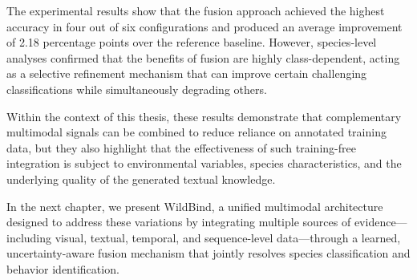 The experimental results show that the fusion approach achieved the highest accuracy in four out of six configurations and produced an average improvement of 2.18 percentage points over the reference baseline. However, species-level analyses confirmed that the benefits of fusion are highly class-dependent, acting as a selective refinement mechanism that can improve certain challenging classifications while simultaneously degrading others.

Within the context of this thesis, these results demonstrate that complementary multimodal signals can be combined to reduce reliance on annotated training data, but they also highlight that the effectiveness of such training-free integration is subject to environmental variables, species characteristics, and the underlying quality of the generated textual knowledge.

In the next chapter, we present WildBind, a unified multimodal architecture designed to address these variations by integrating multiple sources of evidence---including visual, textual, temporal, and sequence-level data---through a learned, uncertainty-aware fusion mechanism that jointly resolves species classification and behavior identification.